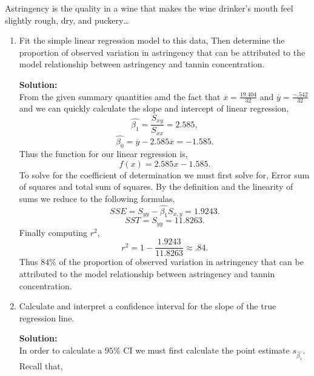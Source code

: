 \documentclass[12pt]{article}
\makeatletter
\theoremstyle{homework}
\newenvironment{exercise}[1]
{\def\@currentlabel{#1}\exercisecore}
{\endexercisecore}
\newcommand{\localhead}[1]{\par\smallskip\noindent\textbf{#1}\nobreak\\}%
\newcommand\solution{\localhead{Solution:}}
\makeatother
\begin{document}
\begin{exercise}{12.46} Astringency is the quality in a wine that makes the wine drinker's mouth feel slightly rough, dry, and puckery\dots
  \begin{enumerate}
    \item Fit the simple linear regression model to this data,
    Then determine the proportion of observed variation in astringency that can
    be attributed to the model relationship between 
    astringency and tannin concentration.\\
    \solution From the given summary quantities amd the fact that $\overline{x} = \frac{19.404}{32}$ and $\overline{y} = \frac{-.542}{32}$ and  we can quickly calculate the slope and intercept of linear regression,
    \begin{equation*}
      \hat{\beta_1} = \dfrac{S_{xy}}{S_{xx}} = 2.585,
    \end{equation*}
    \begin{equation*}
      \hat{\beta_0} = \overline{y} - 2.585\overline{x}  = -1.585.
    \end{equation*}
    Thus the function for our linear regression is,
    \begin{equation*}
      f(x) = 2.585x-1.585.
    \end{equation*}
    To solve for the coefficient of determination we must first solve for, Error sum of squares and total sum of squares. By the definition and
    the linearity of sums we reduce to the following formulas,
    \begin{equation*}
      SSE = S_{yy} - \hat{\beta_1}S_{x,y} = 1.9243.
    \end{equation*}  
    \begin{equation*}
      SST = S_{yy} = 11.8263.
    \end{equation*}  
    Finally computing $r^2$,
    \begin{equation*}
      r^2 = 1 - \dfrac{1.9243}{11.8263} \approx .84.
    \end{equation*}
    Thus $84\%$ of the proportion of observed variation in astringency that can
    be attributed to the model relationship between 
    astringency and tannin concentration.
    \vspace{.25in}



    \item Calculate and interpret a confidence interval for the slope of the true regression line.\\
    \solution In order to calculate a $95\%$ CI we must first calculate the point estimate $s_{\hat{\beta_1}}$. Recall that,
    

\end{enumerate}
\end{exercise}
\end{document}
